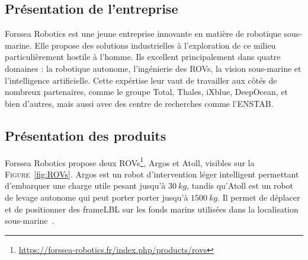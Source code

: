 \subsection{Présentation de l'entreprise}
    Forssea Robotics est une jeune entreprise innovante en matière de robotique sous-marine. Elle propose des solutions industrielles à l'exploration de ce milieu particulièrement hostile à l'homme. Ils excellent principalement dans quatre domaines : la robotique autonome, l'ingénierie des \gls{ROV}s, la vision sous-marine et l'intelligence artificielle. Cette expértise leur vaut de travailler aux côtés de nombreux partenaires, comme le groupe Total, Thales, iXblue, DeepOcean, et bien d'autres, mais aussi avec des centre de recherches comme l'\gls{ENSTAB}.

\subsection{Présentation des produits}
    Forssea Robotics propose deux \gls{ROV}s\footnote{\url{https://forssea-robotics.fr/index.php/products/rovs}}, \gls{Argos} et \gls{Atoll}, visibles sur la \textsc{Figure}~\ref{fig:ROVs}. \gls{Argos} est un robot d'intervention léger intelligent permettant d'embarquer une charge utile pesant jusqu'à $30\ kg$, tandis qu'\gls{Atoll} est un robot de levage autonome qui peut porter porter jusqu'à $1500\ kg$. Il permet de déplacer et de positionner des \gls{frameLBL} sur les fonds marins utilisées dans la localisation sous-marine~\cite{milne1983underwater}.


